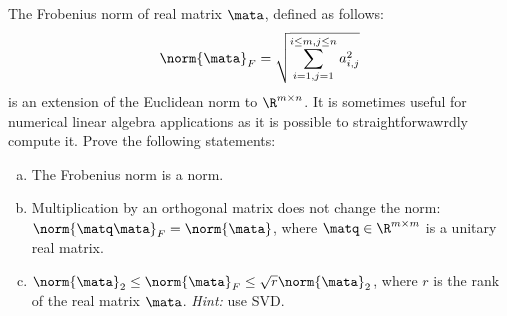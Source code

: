 \begin{Problem}
  The Frobenius norm of real matrix $\mata$, defined as follows:
  \begin{gather*}
    \norm{\mata}_F = \sqrt{\sum_{i=1,j=1}^{i\leq m,j\leq n} a_{i,j}^2}
  \end{gather*}
  is an extension of the Euclidean norm to $\R^{m\times n}$. It is
  sometimes useful for numerical linear algebra applications as it
  is possible to straightforwawrdly compute it. Prove the following
  statements:
  \begin{enumerate}[(a)]
  \item The Frobenius norm is a norm.
  \item Multiplication by an orthogonal matrix does not change the
    norm: $\norm{\matq\mata}_F = \norm{\mata}$, where
    $\matq\in\R^{m\times m}$ is a unitary real matrix.
  \item
    $\norm{\mata}_2 \leq \norm{\mata}_F \leq
    \sqrt{r}\norm{\mata}_2$, where $r$ is the rank of the real
    matrix $\mata$. \textit{Hint:} use SVD.
  \end{enumerate}
\end{Problem}
